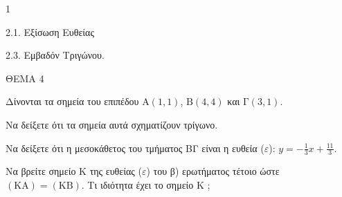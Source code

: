 \begin{ylh}{1}
    \item 2.1. Εξίσωση Ευθείας
    \item 2.3. Εμβαδόν Τριγώνου.
\end{ylh}
ΘΕΜΑ 4

Δίνονται τα σημεία του επιπέδου $\text{A}(1,1)$, $\text{B}(4,4)$ και $\text{Γ}(3,1)$.

\begin{alist}
\item Να δείξετε ότι τα σημεία αυτά σχηματίζουν τρίγωνο.  
\item Να δείξετε ότι η μεσοκάθετος του τμήματος ΒΓ είναι η ευθεία ($\varepsilon$): $y = -\frac{1}{3}x + \frac{11}{3}$.  
\item Να βρείτε σημείο Κ της ευθείας ($\varepsilon$) του β) ερωτήματος τέτοιο ώστε $(\text{KA})=(\text{KB})$. Τι ιδιότητα έχει το σημείο Κ ;  
\end{alist}